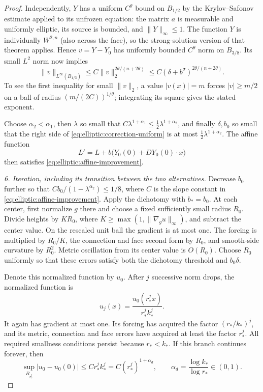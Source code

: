\begin{proof}
Independently, $Y$ has a uniform $C^\theta$ bound on $B_{1/2}$ by the
Krylov--Safonov estimate applied to its unfrozen equation: the matrix
$a$ is measurable and uniformly elliptic, its source is bounded, and
$\|Y\|_\infty\leq1$.  The function $Y$ is individually $W^{2,n}$
(also across the face), so the strong-solution version of that theorem
applies.  Hence $v=Y-Y_0$ has uniformly bounded $C^\theta$ norm on
$B_{3/8}$.  Its small $L^2$ norm now implies
\begin{equation}
 \|v\|_{L^\infty(B_{1/3})}
  \leq C\|v\|_2^{2\theta/(n+2\theta)}
  \leq C(\delta+b^\sigma)^{2\theta/(n+2\theta)}.
 \label{eq:elliptic:correction-uniform}
\end{equation}
To see the first inequality for small $\|v\|_2$, a value $|v(x)|=m$
forces $|v|\geq m/2$ on a ball of radius $(m/(2C))^{1/\theta}$;
integrating its square gives the stated exponent.

Choose $\alpha_2<\alpha_1$, then $\lambda$ so small that
$C\lambda^{1+\alpha_1}\leq\tfrac12\lambda^{1+\alpha_2}$, and finally
$\delta,b_0$ so small that the right side of
\eqref{eq:elliptic:correction-uniform} is at most
$\tfrac12\lambda^{1+\alpha_2}$.  The affine function
\[
 L'=L+b\bigl(Y_0(0)+DY_0(0)\cdot x\bigr)
\]
then satisfies \eqref{eq:elliptic:affine-improvement}.

\medskip\noindent
\emph{6. Iteration, including its transition between the two alternatives.}
Decrease $b_0$ further so that
$Cb_0/(1-\lambda^{\alpha_2})\leq1/8$, where $C$ is the slope constant
in \eqref{eq:elliptic:affine-improvement}.  Apply the dichotomy
with $b_*=b_0$.  At each center, first normalize $g$ there and choose a
fixed sufficiently small radius $R_0$.  Divide heights by $K R_0$, where
$K\geq\max(1,\|\nabla_g u\|_\infty)$, and subtract the center value.
On the rescaled unit ball the gradient is at most one.  The forcing is
multiplied by $R_0/K$, the connection and face second form by $R_0$,
and smooth-side curvature by $R_0^2$.  Metric oscillation from its center
value is $O(R_0)$.  Choose $R_0$ uniformly so that these errors satisfy
both the dichotomy threshold and $b_0\delta$.

Denote this normalized function by $u_0$.  After $j$ successive norm
drops, the normalized function is
\[
 u_j(x)=\frac{u_0(r_*^j x)}{r_*^j k_*^j}.
\]
It again has gradient at most one.  Its forcing has acquired the factor
$(r_*/k_*)^j$, and its metric, connection and face errors have acquired
at least the factor $r_*^j$.  All required smallness conditions persist
because $r_*<k_*$.  If this branch continues forever, then
\[
 \sup_{B_{r_*^j}}|u_0-u_0(0)|
       \leq C r_*^j k_*^j
       =C(r_*^j)^{1+\alpha_d},
 \qquad\alpha_d=\frac{\log k_*}{\log r_*}\in(0,1).
\]


\end{proof}
